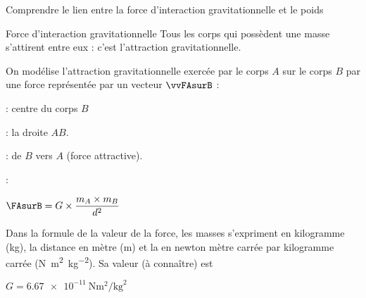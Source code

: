 \teteSndMouv
{}

\begin{objectifs}
  \item Comprendre le lien entre la force d'interaction gravitationnelle et le poids
\end{objectifs}

\begin{doc}{Force d'interaction gravitationnelle}
  \chevron Tous les corps qui possèdent une masse s’attirent entre eux : c’est l’attraction gravitationnelle.

  \begin{importants}
    On modélise l'attraction gravitationnelle exercée par le corps $A$ sur le corps $B$ par une force représentée par un vecteur $\vvFAsurB$ :
    
    \vspace*{-12pt}
    \begin{wrapfigure}[6]{r}{0.4\linewidth}
      \vspace*{-20pt}
      
    \end{wrapfigure}

    \phantom{b}
    \begin{listePoints}
      \item {} : centre du corps $B$
      \item {} : la droite $AB$.
      \item {} : de $B$ vers $A$ (force attractive).
      \item {} : 
    \end{listePoints}
    \begin{center}
      $\FAsurB = G\times \dfrac{m_A \times m_B}{d^2}$
    \end{center}
      
    Dans la formule de la valeur de la force, les masses s'expriment en kilogramme (\unit{\kg}),
    la distance en mètre (\unit{\m}) et
    la  en newton mètre carrée par kilogramme carrée (\unit{\newton \m\squared \per\kg\squared}).
    Sa valeur (à connaître) est 
    \begin{center}
      $G = \qty{6,67e-11}{\newton \m\squared \per\kg\squared}$
    \end{center}
  \end{importants}
\end{doc}

